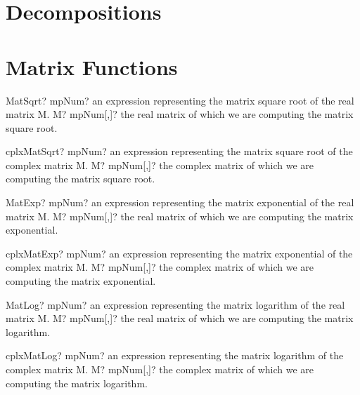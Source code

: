 \documentclass[12pt,a4paper,openany]{book}
\begin{document}
\section{Decompositions}

\section{Matrix Functions}

\begin{mpFunctionsExtract}
\mpFunctionOne
{MatSqrt? mpNum? an expression representing the matrix square root of the real matrix M.}
{M? mpNum[,]? the real matrix of which we are computing the matrix square root.}
\end{mpFunctionsExtract}

\begin{mpFunctionsExtract}
\mpFunctionOne
{cplxMatSqrt? mpNum? an expression representing the matrix square root of the complex matrix M.}
{M? mpNum[,]? the complex matrix of which we are computing the matrix square root.}
\end{mpFunctionsExtract}

\begin{mpFunctionsExtract}
\mpFunctionOne
{MatExp? mpNum? an expression representing the matrix exponential of the real matrix M.}
{M? mpNum[,]? the real matrix of which we are computing the matrix exponential.}
\end{mpFunctionsExtract}

\begin{mpFunctionsExtract}
\mpFunctionOne
{cplxMatExp? mpNum? an expression representing the matrix exponential of the complex matrix M.}
{M? mpNum[,]? the complex matrix of which we are computing the matrix exponential.}
\end{mpFunctionsExtract}

\begin{mpFunctionsExtract}
\mpFunctionOne
{MatLog? mpNum? an expression representing the matrix logarithm of the real matrix M.}
{M? mpNum[,]? the real matrix of which we are computing the matrix logarithm.}
\end{mpFunctionsExtract}

\begin{mpFunctionsExtract}
\mpFunctionOne
{cplxMatLog? mpNum? an expression representing the matrix logarithm of the complex matrix M.}
{M? mpNum[,]? the complex matrix of which we are computing the matrix logarithm.}
\end{mpFunctionsExtract}
\end{document}
